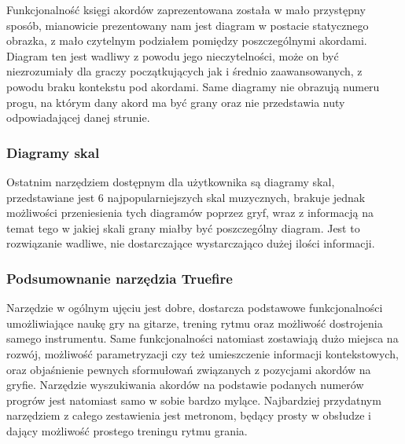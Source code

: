 Funkcjonalność księgi akordów zaprezentowana została w mało przystępny sposób, mianowicie prezentowany nam jest diagram w postacie statycznego obrazka, z mało czytelnym podziałem pomiędzy poszczególnymi akordami. Diagram ten jest wadliwy z powodu jego nieczytelności, może on być niezrozumiały dla graczy początkujących jak i średnio zaawansowanych, z powodu braku kontekstu pod akordami. Same diagramy nie obrazują numeru progu, na którym dany akord ma być grany oraz nie przedstawia nuty odpowiadającej danej strunie.

\subsubsection{Diagramy skal}

Ostatnim narzędziem dostępnym dla użytkownika są diagramy skal, przedstawiane jest 6 najpopularniejszych skal muzycznych, brakuje jednak możliwości przeniesienia tych diagramów poprzez gryf, wraz z informacją na temat tego w jakiej skali grany miałby być poszczególny diagram. Jest to rozwiązanie wadliwe, nie dostarczające wystarczająco dużej ilości informacji. 


\subsubsection{Podsumownanie narzędzia Truefire}

Narzędzie w ogólnym ujęciu jest dobre, dostarcza podstawowe funkcjonalności umożliwiające naukę gry na gitarze, trening rytmu oraz możliwość dostrojenia samego instrumentu. Same funkcjonalności natomiast zostawiają dużo miejsca na rozwój, możliwość parametryzacji czy też umieszczenie informacji kontekstowych, oraz objaśnienie pewnych sformułowań związanych z pozycjami akordów na gryfie. Narzędzie wyszukiwania akordów na podstawie podanych numerów progrów jest natomiast samo w sobie bardzo mylące. Najbardziej przydatnym narzędziem z całego zestawienia jest metronom, będący prosty w obsłudze i dający możliwość prostego treningu rytmu grania. 

